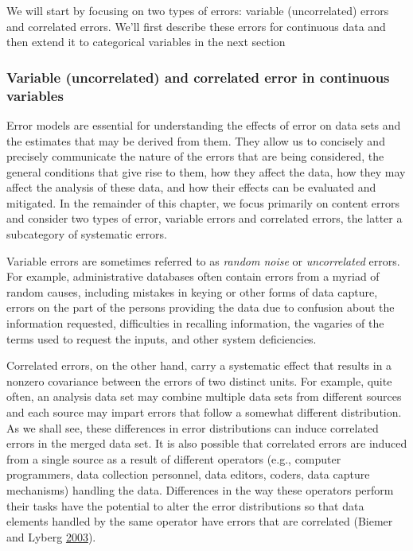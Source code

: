 \documentclass[]{krantz}
\begin{document}
We will start by focusing on two types of errors: variable
(uncorrelated) errors and correlated errors. We'll first describe these
errors for continuous data and then extend it to categorical variables
in the next section

\subsubsection{Variable (uncorrelated) and correlated error in
continuous variables}\label{sec:10-4.2.1}

Error models are essential for understanding the effects of error on
data sets and the estimates that may be derived from them. They allow us
to concisely and precisely communicate the nature of the errors that are
being considered, the general conditions that give rise to them, how
they affect the data, how they may affect the analysis of these data,
and how their effects can be evaluated and mitigated. In the remainder
of this chapter, we focus primarily on content errors and consider two
types of error, variable errors and correlated errors, the latter a
subcategory of systematic errors.

Variable errors are sometimes referred to as \emph{random noise} or
\emph{uncorrelated} errors. For example, administrative databases often
contain errors from a myriad of random causes, including mistakes in
keying or other forms of data capture, errors on the part of the persons
providing the data due to confusion about the information requested,
difficulties in recalling information, the vagaries of the terms used to
request the inputs, and other system deficiencies.

Correlated errors, on the other hand, carry a systematic effect that
results in a nonzero covariance between the errors of two distinct
units. For example, quite often, an analysis data set may combine
multiple data sets from different sources and each source may impart
errors that follow a somewhat different distribution. As we shall see,
these differences in error distributions can induce correlated errors in
the merged data set. It is also possible that correlated errors are
induced from a single source as a result of different operators (e.g.,
computer programmers, data collection personnel, data editors, coders,
data capture mechanisms) handling the data. Differences in the way these
operators perform their tasks have the potential to alter the error
distributions so that data elements handled by the same operator have
errors that are correlated (Biemer and Lyberg
\protect\hyperlink{ref-biemer2003}{2003}).
\end{document}

